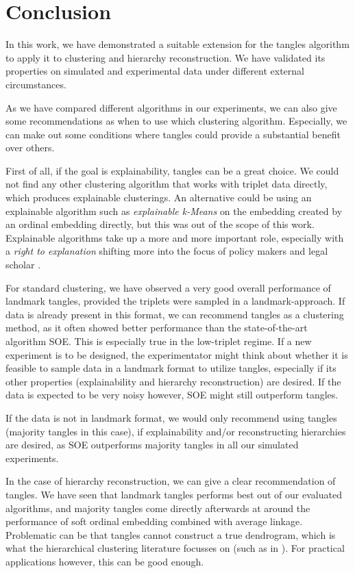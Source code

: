 \chapter{Conclusion}\label{conclusion}
In this work, we have demonstrated a suitable extension for the tangles algorithm to apply it to clustering and hierarchy reconstruction. 
We have validated its properties on simulated and experimental data under different external circumstances. 

As we have compared different algorithms in our experiments, we can also give some recommendations as when to use which clustering algorithm. Especially, we can make out
some conditions where tangles could provide a substantial benefit over others. 

First of all, if the goal is explainability, tangles can be a great choice. We could not find any other clustering algorithm that works with triplet data directly, which produces
explainable clusterings. An alternative could be using an explainable algorithm such as \textit{explainable k-Means} \citep{moshkovitzExplainableKMeansKMedians2020} on the embedding created 
by an ordinal embedding directly, but this was out of the scope of this work. 
Explainable algorithms take up a more and more important role, especially with 
a \textit{right to explanation} shifting more into the focus of policy makers and legal
scholar \citep{selbstMeaningfulInformationRight2017}.

For standard clustering, we have observed a very good overall performance of landmark tangles, provided the triplets were sampled in a landmark-approach. If data is already present in this format, we can recommend
tangles as a clustering method, as it often showed better performance than the state-of-the-art algorithm SOE. This is especially true in the low-triplet regime. 
If a new experiment is to be designed, the experimentator might think
about whether it is feasible to sample data in a landmark format to utilize tangles, especially if its other properties (explainability and hierarchy reconstruction) are desired. 
If the data is expected to be very noisy however, SOE might still outperform tangles. 

If the data is not in landmark format, we would only recommend using tangles (majority tangles in this case), if explainability and/or reconstructing hierarchies are desired, as SOE 
outperforms majority tangles in all our simulated experiments.

In the case of hierarchy reconstruction, we can give a clear recommendation of tangles. We have seen that landmark tangles performs best out of our evaluated algorithms, and majority tangles 
come directly afterwards at around the performance of soft ordinal embedding combined with average linkage. 
Problematic can be that tangles cannot construct a true dendrogram, which is what the hierarchical clustering literature focusses on (such as in \cite{ghoshdastidarFoundationsComparisonBasedHierarchical2019}). For practical applications however, this can be good enough. 

